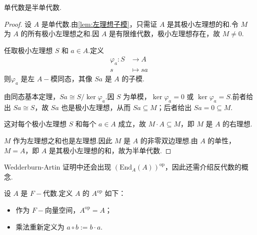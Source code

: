\begin{lemma}
单代数是半单代数.
\end{lemma}
\begin{proof}
设 $A$ 是单代数.由\cref{lem:左理想子模}，只需证 $A$ 是其极小左理想的和.令 $M$ 为 $A$ 的所有极小左理想之和.因 $A$ 是有限维代数，极小左理想存在，故 $M \neq 0$.

任取极小左理想 $S$ 和 $a \in A$.定义 
\begin{align*}
\varphi_a: S &\to A \\[-10pt]
s &\mapsto sa
\end{align*}
则$\varphi_a$ 是左 $A-\!\!$模同态，其像 $Sa$ 是 $A$ 的子模.\par
由同态基本定理，$Sa \cong S / \ker\varphi_a$.因 $S$ 为单模，$\ker\varphi_a = 0$ 或 $\ker\varphi_a = S$.前者给出 $Sa \cong S$，故 $Sa$ 也是极小左理想，从而 $Sa \subseteq M$；后者给出 $Sa = 0 \subseteq M$.\par
这对每个极小左理想 $S$ 和每个 $a \in A$ 成立，故 $M \cdot A \subseteq M$，即 $M$ 是 $A$ 的右理想.\par
$M$ 作为左理想之和也是左理想.因此 $M$ 是 $A$ 的非零双边理想.由 $A$ 的单性，$M = A$，即 $A$ 是其极小左理想的和，故为半单代数.
\end{proof}


Wedderburn-Artin 证明中还会出现 $(\mathrm{End}_A(A))^{\mathrm{op}}$，因此还需介绍反代数的概念.

\begin{definition}[反代数]
设 $A$ 是 $F-\!\!$代数.定义 $A$ 的 $A^{\mathrm{op}}$ 如下：
\begin{itemize}
    \item 作为 $F-\!\!$向量空间，$A^{\mathrm{op}} = A$；
    \item 乘法重新定义为 $a \circ b := b \cdot a$.
\end{itemize}
\end{definition}

